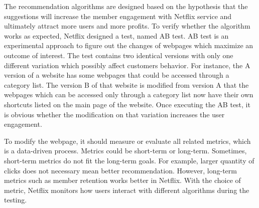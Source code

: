 \documentclass[sigconf]{acmart}
\begin{document}
The recommendation algorithms are designed based on the hypothesis that the suggestions will increase the member engagement with Netflix service and ultimately attract more users and more profits. To verify whether the algorithm works as expected, Netflix designed a test, named AB test. AB test is an experimental approach to figure out the changes of webpages which maximize an outcome of interest. The test contains two identical versions with only one different variation which possibly affect customer\textquotesingle s behavior\cite{Reco1}. For instance, the A version of a website has some webpages that could be accessed through a category list. The version B of that website is modified from version A that the webpages which can be accessed only through a category list now have their own shortcuts listed on the main page of the website. Once executing the AB test, it is obvious whether the modification on that variation increases the user engagement. 
\par
To modify the webpage, it should measure or evaluate all related metrics, which is a data-driven process. Metrics could be short-term or long-term. Sometimes, short-term metrics do not fit the long-term goals. For example, larger quantity of clicks does not necessary mean better recommendation. However, long-term metrics such as member retention works better in Netflix\cite{Reco1}. With the choice of metric, Netflix monitors how users interact with different algorithms during the testing.
\end{document}
